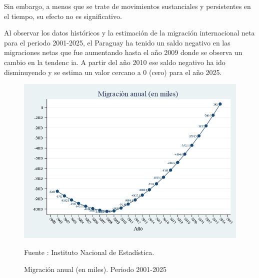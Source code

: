 Sin embargo, a menos que se trate de movimientos sustanciales y
persistentes en el tiempo, su efecto no es significativo.

Al observar los datos históricos y la estimación de la migración
internacional neta para el periodo 2001-2025, el Paraguay ha tenido un
saldo negativo en las migraciones netas que fue aumentando hasta el año
2009 donde se observa un cambio en la tendenc ia. A partir del año 2010
ese saldo negativo ha ido disminuyendo y se estima un valor cercano a 0
(cero) para el año 2025.

\begin{figure}[H]
\begin{center}
                    \caption{Migración anual (en miles). Periodo 2001-2025}
                    \includegraphics[scale=0.45]{INE_indic_miganaul.png}
                                    \item \footnotesize Fuente : Instituto Nacional de Estadística.
                    \end{center}
\end{figure}

